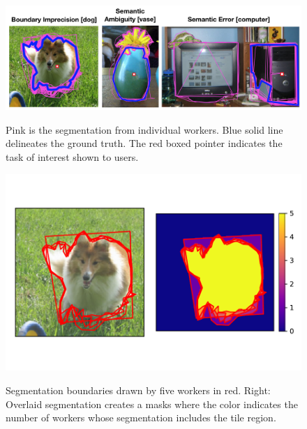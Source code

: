\begin{figure}[ht!]
    \centering
    \RawFloats
    \begin{minipage}[t]{0.65\textwidth}
    	\vspace{-20pt}
        \includegraphics[width=\textwidth]{plots/error_examples.png} %
        \caption{Pink is the segmentation from individual workers. Blue solid line delineates the ground truth. The red boxed pointer indicates the task of interest shown to users.}
        \vspace{-15pt}
        \label{error_examples}
    \end{minipage}
    \begin{minipage}[t]{0.35\textwidth}
    	\vspace{-25pt}
        \includegraphics[width=\textwidth]{plots/tile_demo.pdf}
        \vspace{-35pt}
        \caption{Segmentation boundaries drawn by five workers in red. Right: Overlaid segmentation creates a masks where the color indicates the number of workers whose segmentation includes the tile region.}
        \vspace{-20pt}
        \label{tile_demo}
    \end{minipage}\hfill
\end{figure}
